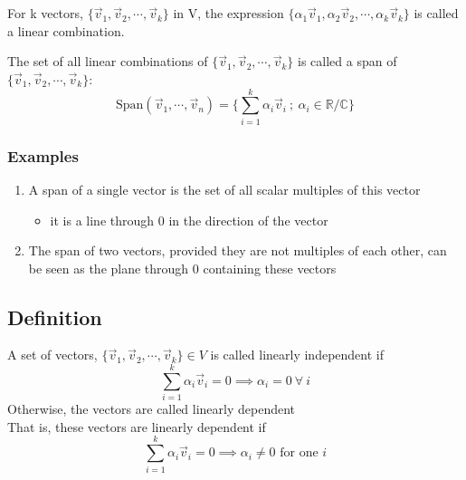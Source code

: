 \documentclass[a4paper, 11pt, normalem]{report}
\newcommand\R{\mathbb{R}}
\begin{document}
\chapter{}
For k vectors, $\{\vec{v}_{1},\vec{v}_{2},\cdots,\vec{v}_{k}\}$ in V, the expression $\{\alpha_{1}\vec{v}_{1},\alpha_{2}\vec{v}_{2},\cdots,\alpha_{k}\vec{v}_{k}\}$ is called a linear combination.

The set of all linear combinations of $\{\vec{v}_{1},\vec{v}_{2},\cdots,\vec{v}_{k}\}$ is called a span of $\{\vec{v}_{1},\vec{v}_{2},\cdots,\vec{v}_{k}\}$:
\begin{equation*}
    \text{Span}(\vec{v}_{1},\cdots,\vec{v}_{n}) = \Bigg\{\sum_{i = 1}^{k} \alpha_{i}\vec{v}_{i} ~;~ \alpha_{i} \in \R / \mathbb{C} \Bigg\}
\end{equation*}

\subsection{Examples}
\begin{enumerate}
    \item A span of a single vector is the set of all scalar multiples of this vector
        \begin{itemize}
            \item it is a line through 0 in the direction of the vector
        \end{itemize}
    \item The span of two vectors, provided they are not multiples of each other, can be seen as the plane through 0 containing these vectors
\end{enumerate}

\section{Definition}
A set of vectors, $\{\vec{v}_{1},\vec{v}_{2},\cdots,\vec{v}_{k}\} \in V$ is called linearly independent if
\begin{equation*}
    \sum_{i = 1}^{k} \alpha_{i}\vec{v}_{i} = 0 \implies \alpha_{i} = 0 ~\forall~ i
\end{equation*}
Otherwise, the vectors are called linearly dependent \\
That is, these vectors are linearly dependent if
\begin{equation*}
    \sum_{i = 1}^{k} \alpha_{i}\vec{v}_{i} = 0 \implies \alpha_{i} \neq 0 \text{ for one }i
\end{equation*}
\end{document}
